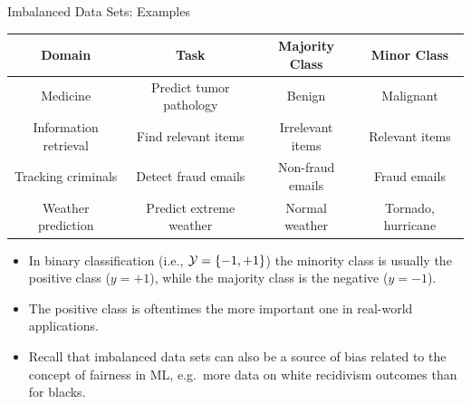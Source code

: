 \documentclass[11pt,compress,t,notes=noshow, xcolor=table]{beamer}
\begin{document}
\begin{vbframe}{Imbalanced Data Sets: Examples}
    \small
    \begin{table}[h]
        \scriptsize
        \centering
        \begin{tabular}{cccc}
            \toprule
            \textbf{Domain} & \textbf{Task} & \textbf{Majority Class} & \textbf{Minor Class} \\ [5pt]
            \hline
            Medicine & Predict tumor pathology & Benign &  Malignant \\ [5pt]
            Information retrieval & Find relevant items & Irrelevant items & Relevant items \\ [5pt]
            Tracking criminals & Detect fraud emails & Non-fraud emails & Fraud emails \\ [5pt]
            Weather prediction & Predict extreme weather & Normal weather & Tornado, hurricane \\
            \hline
        \end{tabular}
    \end{table}
    
	\begin{itemize}
        \item In binary classification (i.e., $\mathcal{Y} =\{-1,+1\}$) the minority class is usually the positive class ($y=+1$), while the majority class is the negative ($y=-1$). 
        \item The positive class is oftentimes the more important one in real-world applications.
        \item Recall that imbalanced data sets can also be a source of bias related to the concept of fairness in ML, e.g.\ more data on white recidivism outcomes than for blacks.
	\end{itemize}

\end{vbframe}
\end{document}
